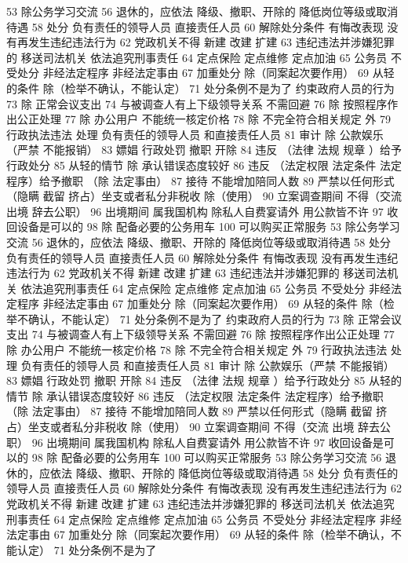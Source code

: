 \documentclass[cyan]{elegantnote}
\begin{document}
53 除公务学习交流
56 退休的，应依法
降级、撤职、开除的 降低岗位等级或取消待遇
58 处分
负有责任的领导人员
直接责任人员
60 解除处分条件
有悔改表现
没有再发生违纪违法行为
62 党政机关不得
新建 改建 扩建
63 违纪违法并涉嫌犯罪的
移送司法机关
依法追究刑事责任
64 定点保险 定点维修 定点加油
65 公务员 不受处分
非经法定程序
非经法定事由
67 加重处分
除（同案起次要作用）
69 从轻的条件
除（检举不确认，不能认定）
71 处分条例不是为了
约束政府人员的行为
73 除 正常会议支出
74 与被调查人有上下级领导关系 不需回避
76 除 按照程序作出公正处理
77 除 办公用户
不能统一核定价格
78 除 不完全符合相关规定 外
79 行政执法违法 处理
负有责任的领导人员
和直接责任人员
81 审计
除 公款娱乐（严禁 不能报销）
83 嫖娼 行政处罚
撤职 开除
84 违反 （法律 法规 规章 ）给予行政处分
85 从轻的情节
除 承认错误态度较好
86 违反 （法定权限 法定条件 法定程序）给予撤职
（除 法定事由）
87 接待 不能增加陪同人数
89 严禁以任何形式（隐瞒 截留 挤占）坐支或者私分非税收
除（使用）
90 立案调查期间 不得（交流 出境 辞去公职）
96 出境期间 属我国机构 除私人自费宴请外 用公款皆不许
97 收回设备是可以的
98 除 配备必要的公务用车
100 可以购买正常服务
53 除公务学习交流
56 退休的，应依法
降级、撤职、开除的 降低岗位等级或取消待遇
58 处分
负有责任的领导人员
直接责任人员
60 解除处分条件
有悔改表现
没有再发生违纪违法行为
62 党政机关不得
新建 改建 扩建
63 违纪违法并涉嫌犯罪的
移送司法机关
依法追究刑事责任
64 定点保险 定点维修 定点加油
65 公务员 不受处分
非经法定程序
非经法定事由
67 加重处分
除（同案起次要作用）
69 从轻的条件
除（检举不确认，不能认定）
71 处分条例不是为了
约束政府人员的行为
73 除 正常会议支出
74 与被调查人有上下级领导关系 不需回避
76 除 按照程序作出公正处理
77 除 办公用户
不能统一核定价格
78 除 不完全符合相关规定 外
79 行政执法违法 处理
负有责任的领导人员
和直接责任人员
81 审计
除 公款娱乐（严禁 不能报销）
83 嫖娼 行政处罚
撤职 开除
84 违反 （法律 法规 规章 ）给予行政处分
85 从轻的情节
除 承认错误态度较好
86 违反 （法定权限 法定条件 法定程序）给予撤职
（除 法定事由）
87 接待 不能增加陪同人数
89 严禁以任何形式（隐瞒 截留 挤占）坐支或者私分非税收
除（使用）
90 立案调查期间 不得（交流 出境 辞去公职）
96 出境期间 属我国机构 除私人自费宴请外 用公款皆不许
97 收回设备是可以的
98 除 配备必要的公务用车
100 可以购买正常服务
53 除公务学习交流
56 退休的，应依法
降级、撤职、开除的 降低岗位等级或取消待遇
58 处分
负有责任的领导人员
直接责任人员
60 解除处分条件
有悔改表现
没有再发生违纪违法行为
62 党政机关不得
新建 改建 扩建
63 违纪违法并涉嫌犯罪的
移送司法机关
依法追究刑事责任
64 定点保险 定点维修 定点加油
65 公务员 不受处分
非经法定程序
非经法定事由
67 加重处分
除（同案起次要作用）
69 从轻的条件
除（检举不确认，不能认定）
71 处分条例不是为了
\end{document}
